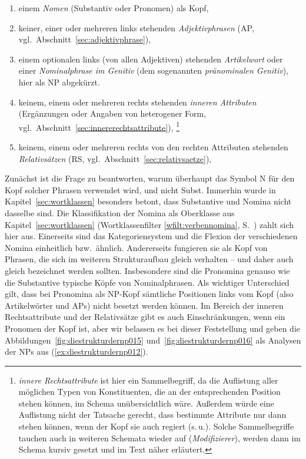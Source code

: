 \begin{enumerate}
  \item einem \textit{Nomen} (Substantiv oder Pronomen) als Kopf,
  \item keiner, einer oder mehreren links stehenden \textit{Adjektivphrasen} (AP, vgl.\ Abschnitt~\ref{sec:adjektivphrase}),
  \item einem optionalen links (von allen Adjektiven) stehenden \textit{Artikelwort} oder einer \textit{Nominalphrase im Genitiv} (dem sogenannten \textit{pränominalen Genitiv}), hier als NP abgekürzt.
  \item keinem, einem oder mehreren rechts stehenden \textit{inneren Attributen} (Ergänzungen oder Angaben von heterogener Form, vgl.\ Abschnitt~\ref{sec:innererechtsattribute}),%
    \footnote{\textit{innere Rechtsattribute} ist hier ein Sammelbegriff, da die Auflistung aller möglichen Typen von Konstituenten, die an der entsprechenden Position stehen können, im Schema unübersichtlich wäre.
Außerdem würde eine Auflistung nicht der Tatsache gerecht, dass bestimmte Attribute nur dann stehen können, wenn der Kopf sie auch regiert (s.\,u.).
Solche Sammelbegriffe tauchen auch in weiteren Schemata wieder auf (\zB \textit{Modifizierer}), werden dann im Schema kursiv gesetzt und im Text näher erläutert.
}
  \item keinem, einem oder mehreren rechts von den rechten Attributen stehenden \textit{Relativsätzen} (RS, vgl.\ Abschnitt~\ref{sec:relativsaetze}),
\end{enumerate}


Zunächst ist die Frage zu beantworten, warum überhaupt das Symbol N für den Kopf solcher Phrasen verwendet wird, und nicht Subst.
Immerhin wurde in Kapitel~\ref{sec:wortklassen} besonders betont, dass Substantive und Nomina nicht dasselbe sind.
Die Klassifikation der Nomina als Oberklasse aus Kapitel~\ref{sec:wortklassen} (Wortklassenfilter \ref{wfilt:verbennomina}, S.~\pageref{wfilt:verbennomina}) zahlt sich hier aus.
Einerseits sind das Kategoriensystem und die Flexion der verschiedenen Nomina einheitlich bzw.\ ähnlich.
Andererseits fungieren sie als Kopf von Phrasen, die sich im weiteren Strukturaufbau gleich verhalten -- und daher auch gleich bezeichnet werden sollten.
Insbesondere sind die Pronomina genauso wie die Substantive typische Köpfe von Nominalphrasen.
Als wichtiger Unterschied gilt, dass bei Pronomina als NP-Kopf sämtliche Positionen links vom Kopf (also Artikelwörter und APs) nicht besetzt werden können.
Im Bereich der inneren Rechtsattribute und der Relativsätze gibt es auch Einschränkungen, wenn ein Pronomen der Kopf ist, aber wir belassen es bei dieser Feststellung und geben die Abbildungen~\ref{fig:diestrukturdernp015} und~\ref{fig:diestrukturdernp016} als Analysen der NPs aus (\ref{ex:diestrukturdernp012}).

